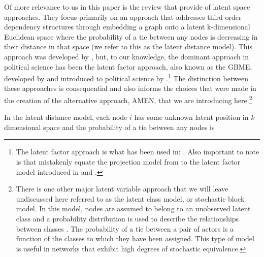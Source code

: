 Of more relevance to us in this paper is the review that \citet{cranmer:etal:2016} provide of latent space approaches. They focus primarily on an approach that addresses third order dependency structures through embedding a graph onto a latent k-dimensional Euclidean space where the probability of a tie between any nodes is decreasing in their distance in that space (we refer to this as the latent distance model). This approach was developed by \citet{hoff:etal:2002}, but, to our knowledge, the dominant approach in political science has been the latent factor approach, also known as the GBME, developed by \citet{hoff:2005} and introduced to political science by \citet{hoff:ward:2004}.\footnote{The latent factor approach is what has been used in: \citet{ward:etal:2007,cao:ward:2014,metternich:etal:2015}. Also important to note is that \citet{cranmer:etal:2016} mistakenly equate the projection model from \citet{hoff:etal:2002} to the latent factor model introduced in \citet{hoff:ward:2004} and \citet{hoff:2005}.} The distinction between these approaches is consequential and also informs the choices that were made in the creation of the alternative approach, AMEN, that we are introducing here.\footnote{There is one other major latent variable approach that we will leave undiscussed here referred to as the latent class model, or stochastic block model. In this model, nodes are assumed to belong to an unobserved latent class and a probability distribution is used to describe the relationships between classes \citep{nowicki:snijders:2001}. The probability of a tie between a pair of actors is a function of the classes to which they have been assigned. This type of model is useful in networks that exhibit high degrees of stochastic equivalence.} 



In the latent distance model, each node $i$ has some unknown latent position in $k$ dimensional space and the probability of a tie between any nodes is 




